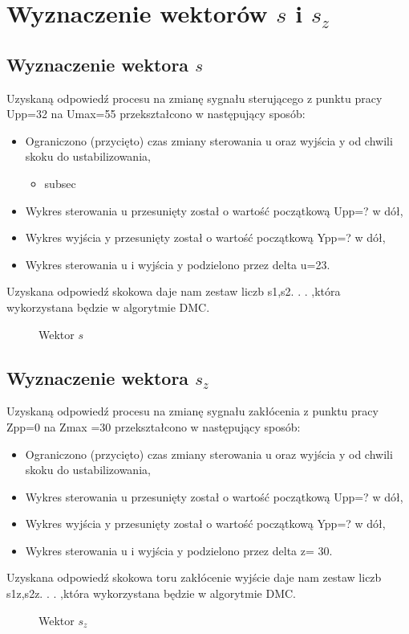 \section{Wyznaczenie wektorów $s$ i $s_z$ }
\label{projekt:zad3}

\subsection{Wyznaczenie wektora $s$}
\label{projekt:zad3:s}

Uzyskaną odpowiedź procesu na zmianę sygnału sterującego z punktu pracy Upp=32 na
Umax=55 przekształcono w następujący sposób: 
\begin{itemize}
    \item Ograniczono (przycięto) czas zmiany sterowania u oraz wyjścia y od chwili skoku do ustabilizowania, 
    \begin{itemize}
        \item subsec
    \end{itemize}
    \item Wykres sterowania u przesunięty został o wartość początkową Upp=? w dół, 
    \item Wykres wyjścia y przesunięty został o wartość początkową Ypp=? w dół, 
    \item Wykres sterowania u i wyjścia y podzielono przez delta u=23. 
\end{itemize}

Uzyskana odpowiedź skokowa daje nam zestaw liczb s1,s2. . . ,która wykorzystana będzie w algorytmie DMC.

\begin{figure}[H] 
    \centering
    
    \caption{Wektor $s$}
    \label{projekt:zad3:s:figure}
\end{figure}

\subsection{Wyznaczenie wektora $s_z$}
\label{projekt:zad3:sz}

Uzyskaną odpowiedź procesu na zmianę sygnału zakłócenia z punktu pracy Zpp=0 na
Zmax =30 przekształcono w następujący sposób: 
\begin{itemize}
\item Ograniczono (przycięto) czas zmiany sterowania u oraz wyjścia y od chwili skoku do ustabilizowania, 
\item Wykres sterowania u przesunięty został o wartość początkową Upp=? w dół, 
\item Wykres wyjścia y przesunięty został o wartość początkową Ypp=? w dół, 
\item Wykres sterowania u i wyjścia y podzielono przez delta z= 30.
\end{itemize}


Uzyskana odpowiedź skokowa toru zakłócenie wyjście daje nam zestaw liczb s1z,s2z. . .
,która wykorzystana będzie w algorytmie DMC.

\begin{figure}[H] 
    \centering
    
    \caption{Wektor $s_{z}$}
    \label{projekt:zad3:sz:figure}
\end{figure}
